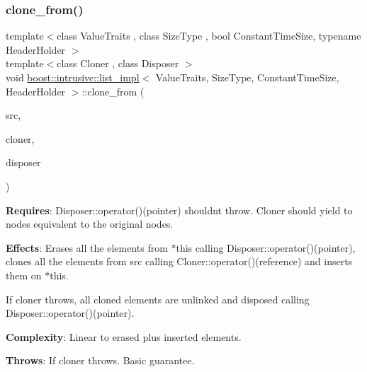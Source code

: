 \subsubsection{\texorpdfstring{clone\+\_\+from()}{clone\_from()}\hspace{0.1cm}{\footnotesize\ttfamily [2/2]}}
{\footnotesize\ttfamily template$<$class Value\+Traits , class Size\+Type , bool Constant\+Time\+Size, typename Header\+Holder $>$ \\
template$<$class Cloner , class Disposer $>$ \\
void \hyperlink{classboost_1_1intrusive_1_1list__impl}{boost\+::intrusive\+::list\+\_\+impl}$<$ Value\+Traits, Size\+Type, Constant\+Time\+Size, Header\+Holder $>$\+::clone\+\_\+from (\begin{DoxyParamCaption}\item[{B\+O\+O\+S\+T\+\_\+\+R\+V\+\_\+\+R\+EF(\hyperlink{classboost_1_1intrusive_1_1list__impl}{list\+\_\+impl}$<$ Value\+Traits, Size\+Type, Constant\+Time\+Size, Header\+Holder $>$)}]{src,  }\item[{Cloner}]{cloner,  }\item[{Disposer}]{disposer }\end{DoxyParamCaption})\hspace{0.3cm}{\ttfamily [inline]}}

{\bfseries Requires}\+: Disposer\+::operator()(pointer) shouldn\textquotesingle{}t throw. Cloner should yield to nodes equivalent to the original nodes.

{\bfseries Effects}\+: Erases all the elements from $\ast$this calling Disposer\+::operator()(pointer), clones all the elements from src calling Cloner\+::operator()(reference) and inserts them on $\ast$this.

If cloner throws, all cloned elements are unlinked and disposed calling Disposer\+::operator()(pointer).

{\bfseries Complexity}\+: Linear to erased plus inserted elements.

{\bfseries Throws}\+: If cloner throws. Basic guarantee. \mbox{\label{classboost_1_1intrusive_1_1list__impl_a1432b9781e8f4525d61d0a529f37d03c}} 
